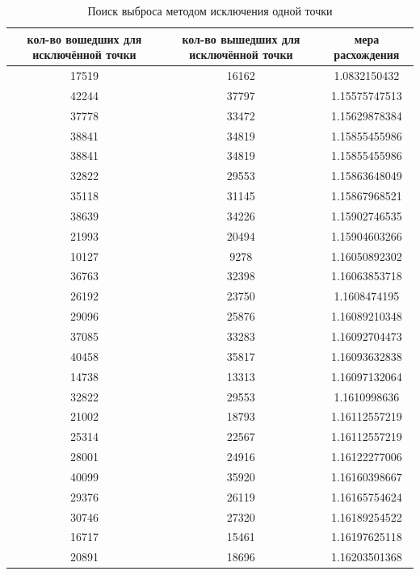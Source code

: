 \documentclass[12pt,a4paper,oneside]{extarticle}
\begin{document}
    \begin{table}[ht!]
        \caption{Поиск выброса методом исключения одной точки}
        \centering
        \label{tabular:data1}
        \tiny
        \begin{tabular}{|c|c|c|}
        \hline
        кол-во вошедших для исключённой точки & кол-во вышедших для исключённой точки & мера расхождения \\ \hline
        17519 & 16162 & 1.0832150432 \\ \hline 
        42244 & 37797 & 1.15575747513 \\ \hline 
        37778 & 33472 & 1.15629878384 \\ \hline 
        38841 & 34819 & 1.15855455986 \\ \hline 
        38841 & 34819 & 1.15855455986 \\ \hline 
        32822 & 29553 & 1.15863648049 \\ \hline 
        35118 & 31145 & 1.15867968521 \\ \hline 
        38639 & 34226 & 1.15902746535 \\ \hline 
        21993 & 20494 & 1.15904603266 \\ \hline 
        10127 & 9278 & 1.16050892302 \\ \hline 
        36763 & 32398 & 1.16063853718 \\ \hline 
        26192 & 23750 & 1.1608474195 \\ \hline 
        29096 & 25876 & 1.16089210348 \\ \hline 
        37085 & 33283 & 1.16092704473 \\ \hline 
        40458 & 35817 & 1.16093632838 \\ \hline 
        14738 & 13313 & 1.16097132064 \\ \hline 
        32822 & 29553 & 1.1610998636 \\ \hline 
        21002 & 18793 & 1.16112557219 \\ \hline 
        25314 & 22567 & 1.16112557219 \\ \hline 
        28001 & 24916 & 1.16122277006 \\ \hline 
        40099 & 35920 & 1.16160398667 \\ \hline 
        29376 & 26119 & 1.16165754624 \\ \hline 
        30746 & 27320 & 1.16189254522 \\ \hline 
        16717 & 15461 & 1.16197625118 \\ \hline 
        20891 & 18696 & 1.16203501368 \\ \hline 

\end{tabular}
\end{table}
\end{document}
